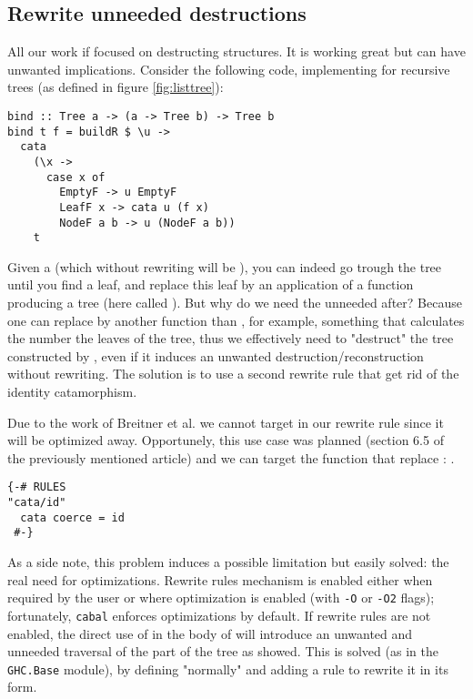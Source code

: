 \subsection{Rewrite unneeded destructions}
\label{sec:bind-def}
All our work if focused on destructing structures. It is working great but can have unwanted implications. Consider the following code, implementing  for recursive trees (as defined in figure \ref{fig:listtree}):

\begin{verbatim}
bind :: Tree a -> (a -> Tree b) -> Tree b
bind t f = buildR $ \u ->
  cata
    (\x ->
      case x of
        EmptyF -> u EmptyF
        LeafF x -> cata u (f x)
        NodeF a b -> u (NodeF a b))
    t
\end{verbatim}

\noindent Given a  (which without rewriting will be ), you can indeed go trough the tree until you find a leaf, and replace this leaf by an application of a function producing a tree (here called ). But why do we need the unneeded  after? Because one can replace  by another function than , for example, something that calculates the number the leaves of the tree, thus we effectively need to "destruct" the tree constructed by , even if it induces an unwanted destruction/reconstruction without rewriting. The solution is to use a second rewrite rule that get rid of the identity catamorphism.

Due to the work of Breitner et al. \cite{Breitner:2014:SZC:2692915.2628141} we cannot target  in our rewrite rule since it will be optimized away. Opportunely, this use case was planned (section 6.5 of the previously mentioned article) and we can target the function that replace : .

\begin{verbatim}
{-# RULES
"cata/id"
  cata coerce = id
 #-}
\end{verbatim}

\noindent As a side note, this problem induces a possible limitation but easily solved: the real need for optimizations. Rewrite rules mechanism is enabled either when required by the user or where optimization is enabled (with \verb|-O| or \verb|-O2| flags); fortunately, \verb|cabal| enforces optimizations by default. If rewrite rules are not enabled, the direct use of  in the body of  will introduce an unwanted and unneeded traversal of the part of the tree as showed. This is solved (as in the \verb|GHC.Base| module), by defining "normally"  and adding a rule to rewrite it in its  form.

